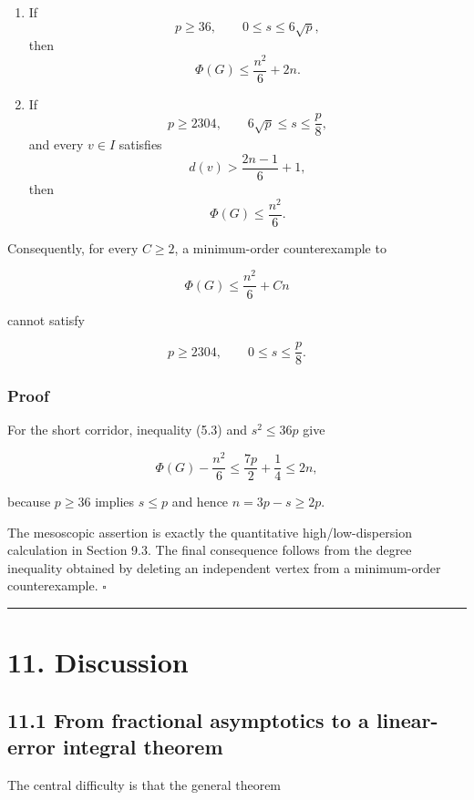 \documentclass[
  11pt,
]{article}
\begin{document}
\begin{enumerate}
\def\labelenumi{\arabic{enumi}.}
\item
  If \[
  p\ge36,
  \qquad
  0\le s\le6\sqrt p,
  \] then \[
  \boxed{
  \Phi(G)\le\frac{n^2}{6}+2n.
  }
  \tag{10.2}
  \]
\item
  If \[
  p\ge2304,
  \qquad
  6\sqrt p\le s\le\frac p8,
  \] and every \(v\in I\) satisfies \[
  d(v)>\frac{2n-1}{6}+1,
  \] then \[
  \boxed{
  \Phi(G)\le\frac{n^2}{6}.
  }
  \tag{10.3}
  \]
\end{enumerate}

Consequently, for every \(C\ge2\), a minimum-order counterexample to

\[
\Phi(G)\le\frac{n^2}{6}+Cn
\]

cannot satisfy

\[
p\ge2304,
\qquad
0\le s\le\frac p8.
\]

\subsubsection{Proof}\label{proof-6}

For the short corridor, inequality (5.3) and \(s^2\le36p\) give

\[
\Phi(G)-\frac{n^2}{6}
\le
\frac{7p}{2}+\frac14
\le
2n,
\]

because \(p\ge36\) implies \(s\le p\) and hence \(n=3p-s\ge2p\).

The mesoscopic assertion is exactly the quantitative high/low-dispersion
calculation in Section 9.3. The final consequence follows from the
degree inequality obtained by deleting an independent vertex from a
minimum-order counterexample. \(\square\)

\begin{center}\rule{0.5\linewidth}{0.5pt}\end{center}

\section{11. Discussion}\label{discussion}

\subsection{11.1 From fractional asymptotics to a linear-error integral
theorem}\label{from-fractional-asymptotics-to-a-linear-error-integral-theorem}

The central difficulty is that the general theorem
\end{document}
